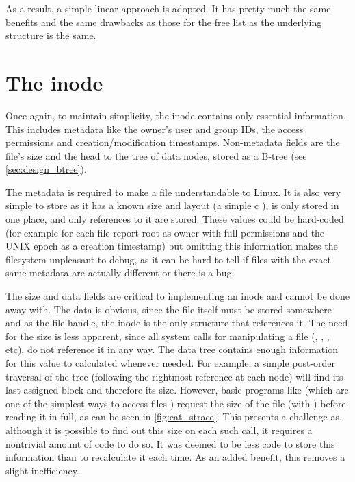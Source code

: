         As a result, a simple linear approach is adopted. It has pretty much
        the same benefits and the same drawbacks as those for the free list as
        the underlying structure is the same.

    \section{The inode}

        Once again, to maintain simplicity, the inode contains only essential
        information. This includes metadata like the owner's user and group
        IDs, the access permissions and creation/modification timestamps.
        Non-metadata fields are the file's size and the head to the tree of
        data nodes, stored as a B-tree (see \autoref{sec:design_btree}).

        The metadata is required to make a file understandable to Linux. It is
        also very simple to store as it has a known size and layout (a simple c
        ), is only stored in one place, and only references
        to it are stored. These values could be hard-coded (for example for
        each file report root as owner with full permissions and the UNIX epoch
        as a creation timestamp) but omitting this information makes the
        filesystem unpleasant to debug, as it can be hard to tell if files with
        the exact same metadata are actually different or there is a bug.

        The size and data fields are critical to implementing an inode and
        cannot be done away with. The data is obvious, since the file itself
        must be stored somewhere and as the file handle, the inode is the only
        structure that references it. The need for the size is less apparent,
        since all system calls for manipulating a file (,
        , ,  etc), do not reference
        it in any way. The data tree contains enough information for this value
        to calculated whenever needed. For example, a simple post-order
        traversal of the tree (following the rightmost reference at each node)
        will find its last assigned block and therefore its size. However, basic
        programs like  (which are one of the simplest ways to
        access files \cite{TLDP_proc_access}) request the size of the file
        (with ) before reading it in full, as can be seen in
        \autoref{fig:cat_strace}. This presents a challenge as, although it is
        possible to find out this size on each such call, it requires a
        nontrivial amount of code to do so. It was deemed to be less code to
        store this information than to recalculate it each time. As an added
        benefit, this removes a slight inefficiency.

